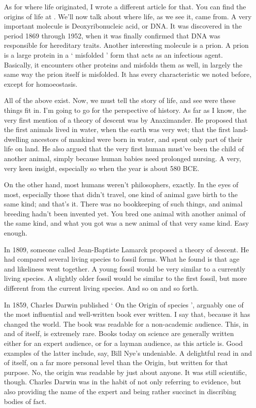 \begin{multicols}{2}
As for where life originated, I wrote a different article for that. You can find the origins of life at . We'll now talk about where life, as we see it, came from. A very important molecule is Deoxyribonucleic acid, or DNA. It was discovered in the period 1869 through 1952, when it was finally confirmed that DNA was responsible for hereditary traits. Another interesting molecule is a prion. A prion is a large protein in a ‘ misfolded ’ form that acts as an infectious agent. Basically, it encounters other proteins and misfolds them as well, in largely the same way the prion itself is misfolded. It has every characteristic we noted before, except for homoeostasis.

All of the above exist. Now, we must tell the story of life, and see were these things fit in. I'm going to go for the perspective of history. As far as I know, the very first mention of a theory of descent was by Anaximander. He proposed that the first animals lived in water, when the earth was very wet; that the first land-dwelling ancestors of mankind were born in water, and spent only part of their life on land. He also argued that the very first human must've been the child of another animal, simply because human babies need prolonged nursing. A very, very keen insight, especially so when the year is about 580 BCE.

On the other hand, most humans weren't philosophers, exactly. In the eyes of most, especially those that didn't travel, one kind of animal gave birth to the same kind; and that's it. There was no bookkeeping of such things, and animal breeding hadn't been invented yet. You bred one animal with another animal of the same kind, and what you got was a new animal of that very same kind. Easy enough.

In 1809, someone called Jean-Baptiste Lamarck proposed a theory of descent. He had compared several living species to fossil forms. What he found is that age and likeliness went together. A young fossil would be very similar to a currently living species. A slightly older fossil would be similar to the first fossil, but more different from the current living species. And so on and so forth.

In 1859, Charles Darwin published ‘ On the Origin of species ’, arguably one of the most influential and well-written book ever written. I say that, because it has changed the world. The book was readable for a non-academic audience. This, in and of itself, is extremely rare. Books today on science are generally written either for an expert audience, or for a layman audience, as this article is. Good examples of the latter include, say, Bill Nye's undeniable. A delightful read in and of itself, on a far more personal level than the Origin, but written for that purpose. No, the origin was readable by just about anyone. It was still scientific, though. Charles Darwin was in the habit of not only referring to evidence, but also providing the name of the expert and being rather succinct in discribing bodies of fact.


\end{multicols}
